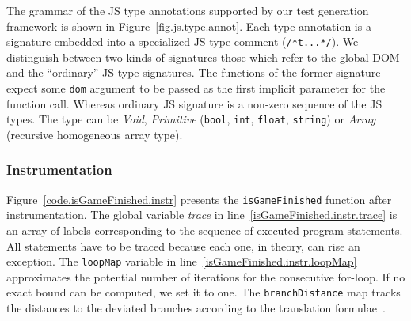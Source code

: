 \documentclass[sigconf,review,anonymous]{acmart}
\begin{document}
The grammar of the JS type annotations supported by our test generation framework is shown in Figure~\ref{fig.js.type.annot}. Each type annotation is a signature embedded into a specialized JS type comment (\texttt{/*t...*/}). We distinguish between two kinds of signatures those which refer to the global DOM and the ``ordinary'' JS type signatures. The functions of the former signature expect some \texttt{dom} argument to be passed as the first implicit parameter for the function call. Whereas ordinary JS signature is a non-zero sequence of the JS types. The type can be \emph{Void}, \emph{Primitive} (\texttt{bool}, \texttt{int}, \texttt{float}, \texttt{string}) or \emph{Array} (recursive homogeneous array type).  

\subsubsection{Instrumentation}
\label{sub.sec.instrument}

Figure~\ref{code.isGameFinished.instr} presents the \texttt{isGameFinished} function after instrumentation. The global variable \emph{trace} in line~\ref{isGameFinished.instr.trace} is an array of labels corresponding to the sequence of executed program statements. All statements have to be traced because each one, in theory, can rise an exception. The \texttt{loopMap} variable in line~\ref{isGameFinished.instr.loopMap} approximates the potential number of iterations for the consecutive for-loop. If no exact bound can be computed, we set it to one. The \texttt{branchDistance} map tracks the distances to the deviated branches according to the translation formulae~\cite{tracey1998automated}.  

\end{document}
